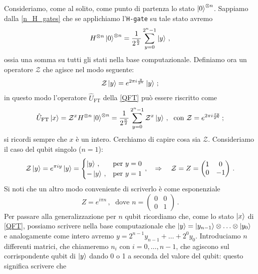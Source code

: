 \noindent Consideriamo, come al solito, come punto di partenza lo stato $\ket 0^{\otimes n}$. Sappiamo dalla \eqref{n_H_gates} che se applichiamo l'\texttt{H-gate} su tale stato avremo
\begin{equation*}
    H^{\otimes n}\ket{0}^{\otimes n} = \frac{1}{2^{\frac n2}}\sum_{y=0}^{2^n-1} \ket y \, ,
\end{equation*}
ossia una somma su tutti gli stati nella base computazionale. Definiamo ora un operatore $\mathcal{Z}$ che agisce nel modo seguente:
\begin{equation*}
    \mathcal{Z}\ket y = e^{2\pi i \frac{y}{2^n}}\ket y \, ;
\end{equation*}
in questo modo l'operatore $\hat U_{\text{FT}}$ della \eqref{QFT} può essere riscritto come
\begin{equation}\label{QFT_with_Z}
    \hat U_{\text{FT}}\ket x = \mathcal{Z}^xH^{\otimes n}\ket{0}^{\otimes n} = \frac{1}{2^{\frac n2}}\sum_{y=0}^{2^n-1} \mathcal{Z}^x \ket y \, , \; \text{ con } \mathcal{Z} = e^{2\pi i \frac{xy}{2^n}} \, ;
\end{equation}
si ricordi sempre che $x$ è un intero. Cerchiamo di capire cosa sia $\mathcal Z$. Consideriamo il caso del qubit singolo ($n=1$):
\begin{equation*}
    \mathcal{Z}\ket y = e^{\pi i y}\ket{y} = 
    \begin{cases}
        \ket{y} \, , &\text{per } y = 0 \\
        -\ket{y} \, , &\text{per } y = 1
    \end{cases}
    \, , \quad \Rightarrow \quad \mathcal{Z} = Z = 
    \begin{pmatrix}
        1 & 0 \\ 0 & -1
    \end{pmatrix} \, .
\end{equation*}
Si noti che un altro modo conveniente di scriverlo è come esponenziale
\begin{equation*}
    Z = e^{i \pi n} \, , \; \text{ dove } n = 
    \begin{pmatrix}
        0 & 0 \\ 0 & 1
    \end{pmatrix} \, .
\end{equation*}
Per passare alla generalizzazione per $n$ qubit ricordiamo che, come lo stato $\ket{x}$ di \eqref{QFT}, possiamo scrivere nella base computazionale che $ \ket y = \ket{y_{n-1}} \otimes \ldots \otimes \ket{y_0}$ e analogamente come intero avremo $y = 2^{n-1} y_{n-1} + \ldots + 2^0 y_0$. Introduciamo $n$ differenti matrici, che chiameremo $n_i$ con $i = 0, \ldots, n-1$, che agiscono sul corrispondente qubit di $\ket{y}$ dando 0 o 1 a seconda del valore del qubit: questo significa scrivere che
